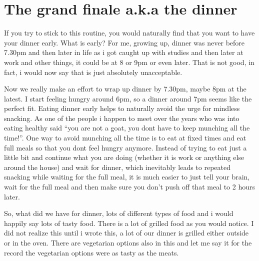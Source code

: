\documentclass[oneside]{book}
\begin{document}
\section{The grand finale a.k.a the
dinner}\label{the-grand-finale-a.k.a-the-dinner}

If you try to stick to this routine, you would naturally find that you
want to have your dinner early. What is early? For me, growing up,
dinner was never before 7.30pm and then later in life as i got caught up
with studies and then later at work and other things, it could be at 8
or 9pm or even later. That is not good, in fact, i would now say that is
just absolutely unacceptable.

Now we really make an effort to wrap up dinner by 7.30pm, maybe 8pm at
the latest. I start feeling hungry around 6pm, so a dinner around 7pm
seems like the perfect fit. Eating dinner early helps to naturally avoid
the urge for mindless snacking. As one of the people i happen to meet
over the years who was into eating healthy said ``you are not a goat,
you dont have to keep munching all the time!''. One way to avoid
munching all the time is to eat at fixed times and eat full meals so
that you dont feel hungry anymore. Instead of trying to eat just a
little bit and continue what you are doing (whether it is work or
anything else around the house) and wait for dinner, which inevitably
leads to repeated snacking while waiting for the full meal, it is much
easier to just tell your brain, wait for the full meal and then make
sure you don't push off that meal to 2 hours later.

So, what did we have for dinner, lots of different types of food and i
would happily say lots of tasty food. There is a lot of grilled food as
you would notice. I did not realize this until i wrote this, a lot of
our dinner is grilled either outside or in the oven. There are
vegetarian options also in this and let me say it for the record the
vegetarian options were as tasty as the meats.
\end{document}
